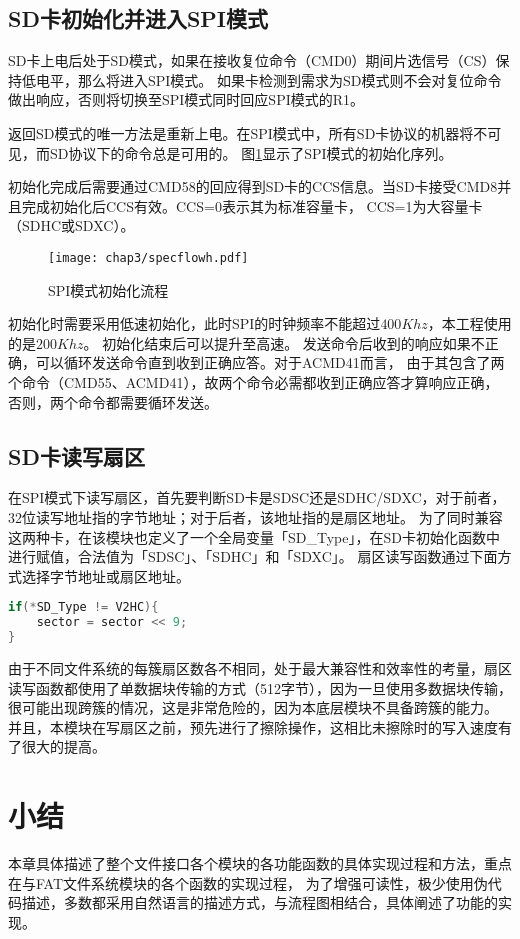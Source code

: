 \subsection{SD卡初始化并进入SPI模式}
\label{sec:Initial}
SD卡上电后处于SD模式，如果在接收复位命令（CMD0）期间片选信号（CS）保持低电平，那么将进入SPI模式。
如果卡检测到需求为SD模式则不会对复位命令做出响应，否则将切换至SPI模式同时回应SPI模式的R1。

返回SD模式的唯一方法是重新上电。在SPI模式中，所有SD卡协议的机器将不可见，而SD协议下的命令总是可用的。
图\ref{fig:specflow}显示了SPI模式的初始化序列。

初始化完成后需要通过CMD58的回应得到SD卡的CCS信息。当SD卡接受CMD8并且完成初始化后CCS有效。CCS=0表示其为标准容量卡，
CCS=1为大容量卡（SDHC或SDXC）。

\begin{figure}[!htbp]
    \centering
    \texttt{[image: chap3/specflowh.pdf]}
    \\
    \caption{SPI模式初始化流程} \label{fig:specflow}
\end{figure}

初始化时需要采用低速初始化，此时SPI的时钟频率不能超过$400Khz$，本工程使用的是$200Khz$。
初始化结束后可以提升至高速。
发送命令后收到的响应如果不正确，可以循环发送命令直到收到正确应答。对于ACMD41而言，
由于其包含了两个命令（CMD55、ACMD41），故两个命令必需都收到正确应答才算响应正确，否则，两个命令都需要循环发送。

\subsection{SD卡读写扇区}
\label{sec:Sectorrw}
在SPI模式下读写扇区，首先要判断SD卡是SDSC还是SDHC/SDXC，对于前者，32位读写地址指的字节地址；对于后者，该地址指的是扇区地址。
为了同时兼容这两种卡，在该模块也定义了一个全局变量「SD\_Type」，在SD卡初始化函数中进行赋值，合法值为「SDSC」、「SDHC」和「SDXC」。
扇区读写函数通过下面方式选择字节地址或扇区地址。
\begin{lstlisting}[language={C}, caption={判断SD类型以选择合适的地址单位}]
if(*SD_Type != V2HC){
    sector = sector << 9;
}
\end{lstlisting}

由于不同文件系统的每簇扇区数各不相同，处于最大兼容性和效率性的考量，扇区读写函数都使用了单数据块传输的方式（512字节），因为一旦使用多数据块传输，
很可能出现跨簇的情况，这是非常危险的，因为本底层模块不具备跨簇的能力。
并且，本模块在写扇区之前，预先进行了擦除操作，这相比未擦除时的写入速度有了很大的提高。

\section{小结}
\label{sec:Sum3}
本章具体描述了整个文件接口各个模块的各功能函数的具体实现过程和方法，重点在与FAT文件系统模块的各个函数的实现过程，
为了增强可读性，极少使用伪代码描述，多数都采用自然语言的描述方式，与流程图相结合，具体阐述了功能的实现。

